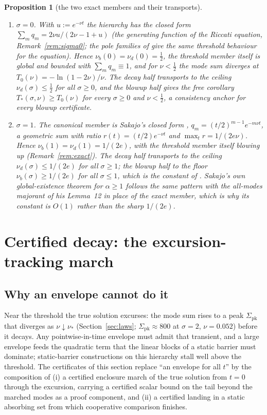 \documentclass[11pt,a4paper]{article}
\theoremstyle{plain}
\newtheorem{proposition}[theorem]{Proposition}
\theoremstyle{definition}
\newcommand{\pk}{\mathrm{pk}}
\begin{document}
\begin{proposition}[the two exact members and their transports]\label{prop:exact}
\begin{enumerate}[label=(\alph*),leftmargin=2.2em]
\item $\sigma=0$. With $u:=e^{-\nu t}$ the hierarchy has the closed form $\sum_mq_m=2\nu u/(2\nu-1+u)$ (the generating function of the Riccati equation, Remark~\ref{rem:sigma0}; the pole families of \cite[\S5.4, \S6]{ALSS24} give the same threshold behaviour for the equation). Hence $\nu_b(0)=\nu_d(0)=\tfrac12$, the threshold member itself is global and bounded with $\sum_mq_m\equiv1$, and for $\nu<\tfrac12$ the mode sum diverges at $T_0(\nu)=-\ln(1-2\nu)/\nu$. The decay half transports to the ceiling $\nu_d(\sigma)\le\tfrac12$ for all $\sigma\ge0$, and the blowup half gives the free corollary $T_*(\sigma,\nu)\ge T_0(\nu)$ for every $\sigma\ge0$ and $\nu<\tfrac12$, a consistency anchor for every blowup certificate.
\item $\sigma=1$. The canonical member is Sakajo's closed form \cite[Lemma~3]{Sak03b}, $q_m=(t/2)^{m-1}e^{-m\nu t}$, a geometric sum with ratio $r(t)=(t/2)e^{-\nu t}$ and $\max_tr=1/(2e\nu)$. Hence $\nu_b(1)=\nu_d(1)=1/(2e)$, with the threshold member itself blowing up (Remark~\ref{rem:exact}). The decay half transports to the ceiling $\nu_d(\sigma)\le1/(2e)$ for all $\sigma\ge1$; the blowup half to the floor $\nu_b(\sigma)\ge1/(2e)$ for all $\sigma\le1$, which is the constant of \cite[Theorem~9]{Sak03b}. Sakajo's own global-existence theorem for $\alpha\ge1$ \cite[Theorem~14]{Sak03c} follows the same pattern with the all-modes majorant of his Lemma~12 in place of the exact member, which is why its constant is $O(1)$ rather than the sharp $1/(2e)$.
\end{enumerate}
\end{proposition}

\section{Certified decay: the excursion-tracking march}\label{sec:decay}

\subsection{Why an envelope cannot do it}
Near the threshold the true solution excurses: the mode sum rises to a peak $\Sigma_{\pk}$ that diverges as $\nu\downarrow\nu_*$ (Section~\ref{sec:laws}; $\Sigma_{\pk}\approx800$ at $\sigma=2$, $\nu=0.052$) before it decays. Any pointwise-in-time envelope must admit that transient, and a large envelope feeds the quadratic term that the linear blocks of a static barrier must dominate; static-barrier constructions on this hierarchy stall well above the threshold. The certificates of this section replace ``an envelope for all $t$'' by the composition of (i) a certified enclosure march of the true solution from $t=0$ through the excursion, carrying a certified scalar bound on the tail beyond the marched modes as a proof component, and (ii) a certified landing in a static absorbing set from which cooperative comparison finishes.
\end{document}
